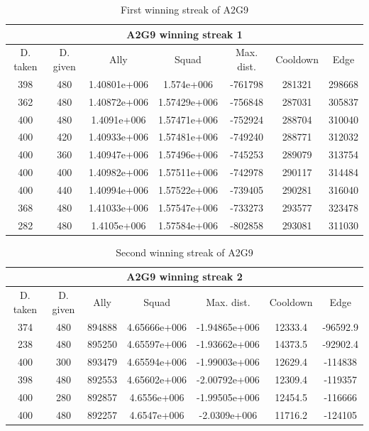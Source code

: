 \begin{centering}
\begin{table}[H]

 \begin{tabular}{|c|c|c|c|c|c|c|}
	\multicolumn{7}{c}{A2G9 winning streak 1} \\
	\hline
	D. taken & D. given & Ally & Squad & Max. dist. & Cooldown & Edge \\
	\hline
		398&480& 1.40801e+006&1.574e+006&-761798&281321&298668\\
		362&480&1.40872e+006&1.57429e+006&-756848&287031&305837\\
		400&480&1.4091e+006&1.57471e+006&-752924&288704&310040\\
		400&420&1.40933e+006&1.57481e+006&-749240&288771&312032\\
		400&360&1.40947e+006&1.57496e+006&-745253&289079&313754\\
		400&400&1.40982e+006&1.57511e+006&-742978&290117&314484\\
		400&440&1.40994e+006&1.57522e+006&-739405&290281&316040\\
		368&480&1.41033e+006&1.57547e+006&-733273&293577&323478\\
		282&480&1.4105e+006&1.57584e+006&-802858&293081&311030\\
	\hline
\end{tabular}

	\label{winning_streak_A2G9_1_1}
	\caption{First winning streak of A2G9}
\end{table}
\end{centering}

\newpage


\begin{centering}
\begin{table}[H]
 \begin{tabular}{|c|c|c|c|c|c|c|}
	\multicolumn{7}{c}{A2G9 winning streak 2} \\
	\hline
	D. taken & D. given & Ally & Squad & Max. dist. & Cooldown & Edge \\
	\hline
			374&480&894888&4.65666e+006&-1.94865e+006&12333.4&-96592.9\\
			238&480&895250&4.65597e+006&-1.93662e+006&14373.5&-92902.4\\
			400&300&893479&4.65594e+006&-1.99003e+006&12629.4&-114838\\
			398&480&892553&4.65602e+006&-2.00792e+006&12309.4&-119357\\
			400&280&892857&4.6556e+006&-1.99505e+006&12454.5&-116666\\
			400&480&892257&4.6547e+006&-2.0309e+006&11716.2&-124105\\
	\hline
\end{tabular}
	\label{winning_streak_A2G9_1_2}
	\caption{Second winning streak of A2G9}
	\end{table}
\end{centering}